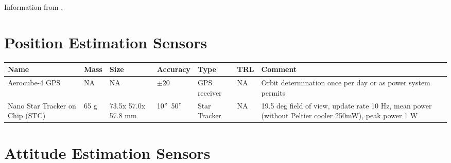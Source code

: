 
Information from \cite{imu2}.

\section{Position Estimation Sensors}
\begin{center}

     \begin{tabular}{ |p{2cm} | p{1cm} | p{2cm} | l | l | l | p{5cm} |}
     \hline

      {\bf Name} & {\bf Mass} & {\bf Size} & {\bf Accuracy} & {\bf Type} & {\bf TRL} & {\bf Comment}  \\ \hline

     Aerocube-4 GPS \cite{Gangestad} & NA & NA &  {$ \pm 20 $} & GPS receiver & NA & Orbit determination once per day or as power system permits \\ \hline

     Nano Star Tracker on Chip (STC) \cite{Prokhorov} & 65 g & 73.5x 57.0x 57.8 mm & 10''~50'' & Star Tracker & NA & 19.5 deg field of view, update rate 10 Hz, mean power (without Peltier cooler 250mW), peak power 1 W \\ \hline
     \end{tabular}
\end{center}

\section{Attitude Estimation Sensors}

